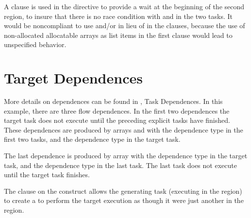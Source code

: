 A  clause is used in the  directive to provide a wait at the beginning of the second 
 region, to insure that there is no race condition with  and  in the two tasks.
It would be noncompliant to use  and/or  in lieu of  in the  clauses, 
because the use of non-allocated allocatable arrays as list items in the first  clause would 
lead to unspecified behavior. 







\section{Target Dependences}
\label{section:target_dependences}

More details on dependences can be found in , Task Dependences. In this example,
there are three flow dependences. In the first two dependences the target task does not execute until
the preceding explicit tasks have finished. These dependences are produced by arrays  and
 with the  dependence type in the first two tasks, and the  dependence type
in the target task. 

The last dependence is produced by array  with the  dependence type in the target task,
and the  dependence type in the last task. The last task does not execute until the target task
finishes.

The  clause on the  construct allows the generating task (executing in the
 region) to create a  to perform the target execution as though it were
just another  in the region.

